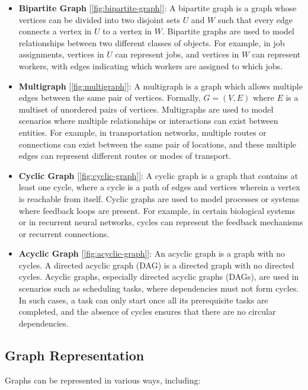 \documentclass[../Thesis.tex]{subfiles}
\begin{document}
\begin{itemize}
		\item \textbf{Bipartite Graph} [\autoref{fig:bipartite-graph}]: A bipartite graph is a graph whose vertices can be divided into two disjoint sets \( U \) and \( W \) such that every edge connects a vertex in \( U \) to a vertex in \( W \). Bipartite graphs are used to model relationships between two different classes of objects. For example, in job assignments, vertices in \( U \) can represent jobs, and vertices in \( W \) can represent workers, with edges indicating which workers are assigned to which jobs.
		
		
		\item \textbf{Multigraph} [\autoref{fig:multigraph}]: A multigraph is a graph which allows multiple edges between the same pair of vertices. Formally, \( G = (V, E) \) where \( E \) is a multiset of unordered pairs of vertices. Multigraphs are used to model scenarios where multiple relationships or interactions can exist between entities. For example, in transportation networks, multiple routes or connections can exist between the same pair of locations, and these multiple edges can represent different routes or modes of transport.
		
		
		\item \textbf{Cyclic Graph} [\autoref{fig:cyclic-graph}]: A cyclic graph is a graph that contains at least one cycle, where a cycle is a path of edges and vertices wherein a vertex is reachable from itself. Cyclic graphs are used to model processes or systems where feedback loops are present. For example, in certain biological systems or in recurrent neural networks, cycles can represent the feedback mechanisms or recurrent connections.
		
		
		\item \textbf{Acyclic Graph} [\autoref{fig:acyclic-graph}]: An acyclic graph is a graph with no cycles. A directed acyclic graph (DAG) is a directed graph with no directed cycles. Acyclic graphs, especially directed acyclic graphs (DAGs), are used in scenarios such as scheduling tasks, where dependencies must not form cycles. In such cases, a task can only start once all its prerequisite tasks are completed, and the absence of cycles ensures that there are no circular dependencies.
		
		
	\end{itemize}
	
	\subsection{Graph Representation}
	Graphs can be represented in various ways, including:
	
\end{document}
